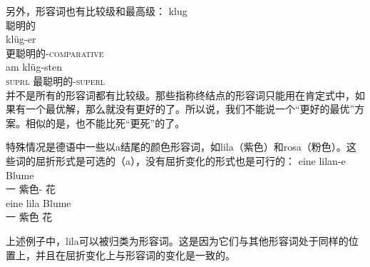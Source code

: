 另外，形容词也有比较级和最高级：
\eal
\ex 
\gll klug\\
	聪明的\\
\ex 
\gll klüg-er\\
	 更聪明的-\textsc{comparative}\\
\ex 
\gll am klüg-sten\\
     \textsc{suprl} 最聪明的-\textsc{superl}\\
\zl
并不是所有的形容词都有比较级。那些指称终结点的形容词只能用在肯定式中，如果有一个最优解，那么就没有更好的了。所以说，我们不能说一个“更好的最优”方案。相似的是，也不能比死“更死”的了。

特殊情况是德语中一些以a结尾的颜色形容词，如lila（紫色）和rosa（粉色）。这些词的屈折形式是可选的（a），没有屈折变化的形式也是可行的：
\eal
\ex 
\gll eine lilan-e Blume\\
	 一 紫色-\fem{} 花\\
\ex 
\gll eine lila Blume\\
	 一 紫色 花\\
\zl

\noindent
上述例子中，lila可以被归类为形容词。这是因为它们与其他形容词处于同样的位置上，并且在屈折变化上与形容词的变化是一致的。

